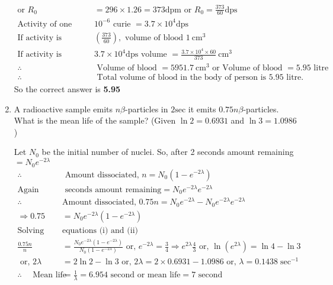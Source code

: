 \begin{enumerate}
\begin{answer}
\begin{align*}
		\text{or }R_0&=296 \times 1.26=373 \mathrm{dpm}\text{ or }R_0=\frac{373}{60} \mathrm{dps}\\
		\text{Activity of one micro curie }&10^{-6}\text{ curie }=3.7 \times 10^4 \mathrm{dps}\\
		\text{If activity is }&\left(\frac{373}{60}\right),\text{ volume of blood }1 \mathrm{~cm}^3\\
		\text{If activity is }&3.7 \times 10^4 \mathrm{dps}\text{ volume }=\frac{3.7 \times 10^4 \times 60}{373} \mathrm{~cm}^3\\
		\therefore\quad&\text{ Volume of blood }=5951.7 \mathrm{~cm}^3\text{ or Volume of blood }=5.95\text{ litre}\\
		\therefore \quad&\text { Total volume of blood in the body of person is } 5.95 \text { litre. }
		\end{align*}
			So the correct answer is \textbf{5.95}
	\end{answer}
		\item  A radioactive sample emits $n \beta$-particles in $2 \mathrm{sec}$ it emits $0.75 n \beta$-particles. What is the mean life of the sample? (Given $\ln 2=0.6931$ and $\ln 3=1.0986$ )
	\begin{answer}
		Let $N_0$ be the initial number of nuclei. So, after 2 seconds amount remaining $=N_0 e^{-2 \lambda}$
		\begin{align*}
		\therefore\quad &\text{ Amount dissociated, }n=N_0\left(1-e^{-2 \lambda}\right)\\
		\text{Again after 2 }&\text{ seconds amount remaining}=N_0 e^{-2 \lambda} e^{-2 \lambda}\\
		\therefore \quad &\text{Amount dissociated, }0.75 n=N_0 e^{-2 \lambda}-N_0 e^{-2 \lambda} e^{-2 \lambda}\\
		\Rightarrow 0.75&=N_0 e^{-2 \lambda}\left(1-e^{-2 \lambda}\right)\\
		\text{Solving }&\text{equations (i) and (ii)}\\
		\frac{0.75 n}{n}&=\frac{N_0 e^{-2 \lambda}\left(1-e^{-2 \lambda}\right)}{N_0\left(1-e^{-2 \lambda}\right)} \text { or, } e^{-2 \lambda}=\frac{3}{4} \Rightarrow e^{2 \lambda} \frac{4}{3} \text { or, } \ln \left(e^{2 \lambda}\right)=\ln 4-\ln 3\\
	\text{	or, }2 \lambda&=2 \ln 2-\ln 3\text{ or, }2 \lambda=2 \times 0.6931-1.0986\text{ or, }\lambda=0.1438 \sec ^{-1}\\
		\therefore\quad \text{ Mean life }&=\frac{1}{\lambda}=6.954\text{ second or mean life} =7\text{ second}
		\end{align*}

\end{answer}
\end{enumerate}
